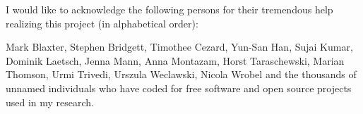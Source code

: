 

\begin{acknowledgements}      %


  I would like to acknowledge the following persons for their
  tremendous help realizing this project (in alphabetical order):

  Mark Blaxter, Stephen Bridgett, Timothee Cezard, Yun-San Han, Sujai
  Kumar, Dominik Laetsch, Jenna Mann, Anna Montazam, Horst
  Taraschewski, Marian Thomson, Urmi Trivedi, Urszula Weclawski,
  Nicola Wrobel and the thousands of unnamed individuals who have
  coded for free software and open source projects used in my
  research.

\end{acknowledgements}



